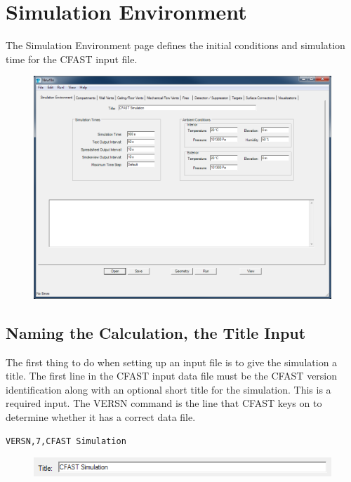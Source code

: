 \section{Simulation Environment}

The Simulation Environment page defines the initial conditions and simulation time for the CFAST input file.

\begin{figure}[h!]
\begin{center}
\includegraphics[width=6.5in]{FIGURES/Input_File/Environment_Tab}
\end{center}
\end{figure}

\subsection{Naming the Calculation, the Title Input}

The first thing to do when setting up an input file is to give the simulation a title.  The first line in the CFAST input data file must be the CFAST version identification along with an optional short title for the simulation.  This is a required input.  The VERSN command is the line that CFAST keys on to determine whether it has a correct data file.

\begin{lstlisting}
VERSN,7,CFAST Simulation
\end{lstlisting}

\clearpage

\begin{figure}[h!]
\begin{center}
\includegraphics[width=5.3in]{FIGURES/Input_File/Title}
\end{center}
\end{figure}

